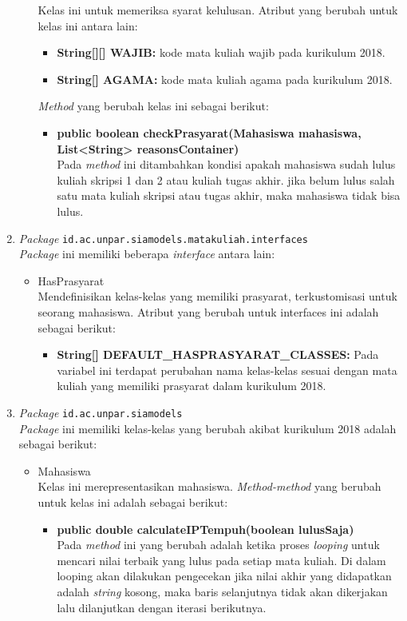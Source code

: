 \begin{enumerate}
\begin{itemize}
		Kelas ini untuk memeriksa syarat kelulusan. Atribut yang berubah untuk kelas ini antara lain:
		\begin{itemize}
			\item \textbf{String[][] WAJIB:} kode mata kuliah wajib pada kurikulum 2018.
			\item \textbf{String[] AGAMA:} kode mata kuliah agama pada kurikulum 2018.
		\end{itemize}
		\textit{Method} yang berubah kelas ini sebagai berikut:
		\begin{itemize}
			\item \textbf{public boolean checkPrasyarat(Mahasiswa mahasiswa, List<String> reasonsContainer)}\\
			Pada \textit{method} ini ditambahkan kondisi apakah mahasiswa sudah lulus kuliah skripsi 1 dan 2 atau kuliah tugas akhir. jika belum lulus salah satu mata kuliah skripsi atau tugas akhir, maka mahasiswa tidak bisa lulus.
		\end{itemize}
	\end{itemize}
	
	\item \textit{Package} \texttt{id.ac.unpar.siamodels.matakuliah.interfaces}\\
	\textit{Package} ini memiliki beberapa \textit{interface} antara lain:
	\begin{itemize}
		\item HasPrasyarat\\
		Mendefinisikan kelas-kelas yang memiliki prasyarat, terkustomisasi untuk seorang mahasiswa. Atribut yang berubah untuk interfaces ini adalah sebagai berikut:
		\begin{itemize}
			\item \textbf{String[] DEFAULT\_HASPRASYARAT\_CLASSES:} Pada variabel ini terdapat perubahan nama kelas-kelas sesuai dengan mata kuliah yang memiliki prasyarat dalam kurikulum 2018.
		\end{itemize}
	\end{itemize}
	
	\item \textit{Package} \texttt{id.ac.unpar.siamodels}\\
	\textit{Package} ini memiliki kelas-kelas yang berubah akibat kurikulum 2018 adalah sebagai berikut:
	\begin{itemize}
			\item Mahasiswa\\
				Kelas ini merepresentasikan mahasiswa. \textit{Method-method} yang berubah untuk kelas ini adalah sebagai berikut:
				\begin{itemize}
					\item \textbf{public double calculateIPTempuh(boolean lulusSaja)}\\
						Pada \textit{method} ini yang berubah adalah ketika proses \textit{looping} untuk mencari nilai terbaik yang lulus pada setiap mata kuliah. Di dalam looping akan dilakukan pengecekan jika nilai akhir yang didapatkan adalah \textit{string} kosong, maka baris selanjutnya tidak akan dikerjakan lalu dilanjutkan dengan iterasi berikutnya.
					

\end{itemize}
\end{itemize}
\end{enumerate}
